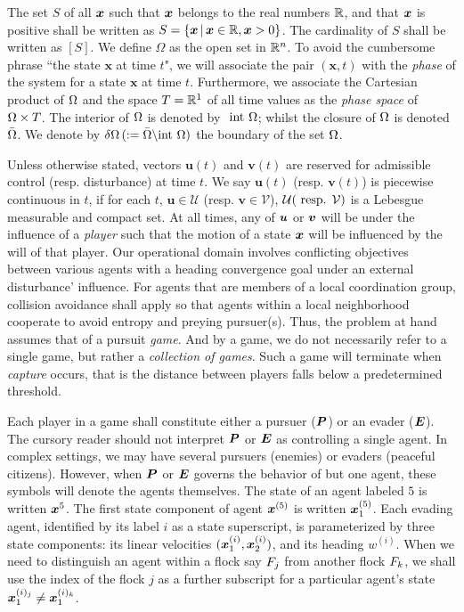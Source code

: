  The set $S$ of all $\bm{x}$ such that $\bm{x}$ belongs to the real numbers  $\mathbb{R}$, and that $\bm{x}$ is positive shall be written as $S=\{\bm{x}\,|\, \bm{x} \in \mathbb{R}, \bm{x} >0\}$. The cardinality of $S$ shall be written as $\left[S\right]$. We define $\Omega$ as the open set in $\mathbb{R}^n$.  To avoid the cumbersome phrase ``the state $\bm{x}$ at time $t$", we will associate the pair $(\bm{x}, t)$ with the \textit{phase} of the system for a state $\bm{x}$ at time $t$. Furthermore, we associate the Cartesian product of $\Omega$ and the space $T =\mathbb{R}^1$ of all time values as the \textit{phase space} of $\Omega \times T$. The interior of $\Omega$ is denoted by $\text{ int } \Omega$; whilst the closure of $\Omega$ is denoted $\bar{\Omega}$. We denote by $\delta \Omega \,(:= \bar{\Omega} \backslash \text{int } \Omega)$ the boundary of the set $\Omega$. 

Unless otherwise stated, vectors $\bm{u}(t)$ and $\bm{v}(t)$ are reserved for admissible control (resp. disturbance) at time $t$. We say $\bm{u}(t)$ (resp. $\bm{v}(t)$) is piecewise continuous in $t$, if for each $t$, $\bm{u} \in \mathcal{U}$ (resp. $\bm{v} \in \mathcal{V}$), $\mathcal{U}(\text{ resp. } \mathcal{V})$ is a Lebesgue measurable and compact set. At all times, any of $\bm{u}$ or $\bm{v}$ will be under the influence of a \textit{player} such that the motion of a state $\bm{x}$ will be influenced by the will of that player. Our operational domain involves conflicting objectives between various agents \eg with a heading convergence goal under an external disturbance' influence. For agents that are members of a local coordination group, collision avoidance shall apply so that  agents within a local neighborhood cooperate to avoid entropy and preying pursuer(s). Thus, the problem at hand assumes that of a pursuit \textit{game}.  And by a game, we do not necessarily refer to a single game, but rather a \textit{collection of games}. Such a game will terminate when \textit{capture} occurs, that is the distance between players falls below a predetermined threshold. 

Each player in a game shall constitute either a pursuer ($\bm{P}$) or an evader ($\bm{E}$). The cursory reader should not interpret $\bm{P}$ or $\bm{E}$ as controlling a single agent. In complex settings, we may have several pursuers (enemies) or evaders (peaceful citizens). However, when $\bm{P}$ or $\bm{E}$ governs the behavior of but one agent, these symbols will denote the agents themselves. The state of an agent labeled \eg $5$ is written $\bm{x}^5$. The first state component of agent $\bm{x}^{(5)}$ is written $\bm{x}^{(5)}_1$. Each evading agent, identified by its  label $i$ as a state superscript,  is parameterized by three state components: its linear velocities $(\bm{x}_1^{(i)}, \bm{x}_2^{(i)})$, and its heading $w^{(i)}$. When we need to distinguish an agent within a flock say $F_j$ from another flock $F_k$, we shall use the index of the flock \eg $j$ as a further subscript for a particular agent's state \ie  $\bm{x}_1^{(i)_j} \neq \bm{x}_1^{(i)_k}$.

